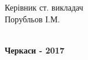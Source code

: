 \documentclass[../main.tex]{subfiles}
\begin{document}
\begin{titlepage}
{\begin{flushright}
\begin{minipage}[t]{4.2cm}
			\end{minipage}
		\end{flushright}
		\begin{flushright}
			\begin{minipage}[t]{6.8cm}
				\begin{flushright}
					Керівник ст. викладач \\
					Порубльов І.М. \\
					\hrulefill \\
				\end{flushright}
			\end{minipage}
		\end{flushright}
    }
    \vfill
    {\centering\bfseries Черкаси - 2017 \\ }
\end{titlepage}
\end{document}
